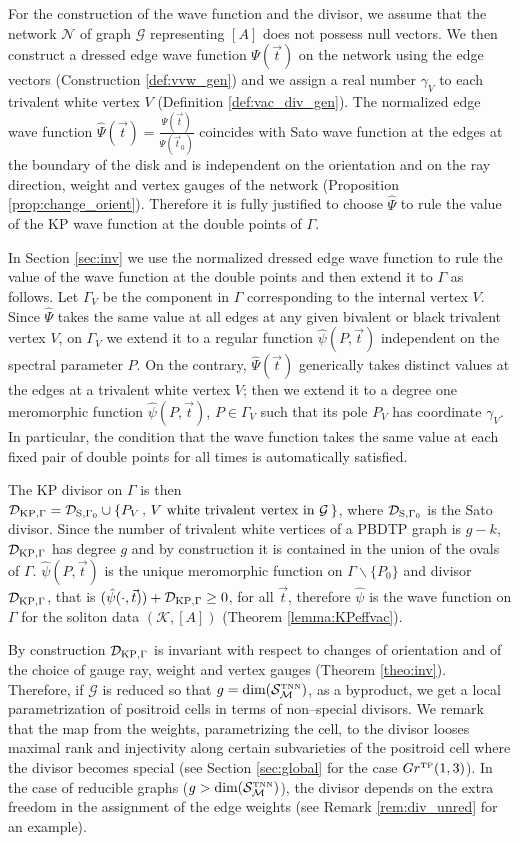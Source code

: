 \documentclass[11pt]{amsart}
\theoremstyle{plain}
\numberwithin{equation}{section}
\def \DKP {{\mathcal D}_{\textup{\scriptsize KP},\Gamma}}
\def \DS {{\mathcal D}_{\textup{\scriptsize S},\Gamma_0}}
\def \S {{\mathcal S}_{\mathcal M}^{\mbox{\tiny TNN}}}
\begin{document}
For the construction of the wave function and the divisor, we assume that the network $\mathcal N$ of graph $\mathcal G$ representing $[A]$ does not possess null vectors. 
We then construct a dressed edge wave function $\Psi (\vec t)$ on the network using the edge vectors (Construction \ref{def:vvw_gen}) and we assign a real number $\gamma_V$ to each trivalent white vertex $V$ (Definition \ref{def:vac_div_gen}). The normalized edge wave function $\hat \Psi(\vec t) = \frac{\Psi (\vec t)}{\Psi (\vec t_0)}$ coincides with Sato wave function at the edges at the boundary of the disk and is independent on the orientation and on the ray direction, weight and vertex gauges of the network (Proposition \ref{prop:change_orient}). Therefore it is fully justified to choose $\hat \Psi$ to rule the value of the KP wave function at the double points of $\Gamma$.

In Section \ref{sec:inv} we use the normalized dressed edge wave function to rule the value of the wave function at the double points and then extend it to $\Gamma$ as follows. Let $\Gamma_V$ be the component in $\Gamma$ corresponding to the internal vertex $V$.
Since $\hat \Psi$ takes the same value at all edges at any given bivalent or black trivalent vertex $V$, on $\Gamma_V$ we extend it to a regular function $\hat \psi(P,\vec t)$ independent on the spectral parameter $P$. On the contrary, $\hat \Psi (\vec t)$ generically takes distinct values at the edges at a trivalent white vertex $V$; then we extend it to a degree one meromorphic function  $\hat \psi(P,\vec t)$, $P\in\Gamma_V$ such that its pole $P_V$ has coordinate $\gamma_V$. In particular, the condition that the wave function takes the same value at each fixed pair of double points for all times is automatically satisfied.
 
The KP divisor on $\Gamma$ is then $\DKP =\DS \cup \{ P_V \, , \, V \mbox{ white trivalent vertex in } \mathcal G \, \}$, where $\DS$ is the Sato divisor. Since the number of trivalent white vertices of a PBDTP graph is $g-k$, $\DKP$ has degree $g$ and by construction it is contained in the union of the ovals of $\Gamma$. $\hat \psi(P,\vec t)$ is the unique meromorphic function on $\Gamma\backslash \{ P_0\}$ and divisor $\DKP$, that is $(\hat \psi(\cdot,\vec t)) + \DKP \ge 0$, for all $\vec t$, therefore $\hat \psi$ is the wave function on $\Gamma$ for the soliton data $(\mathcal K, [A])$ (Theorem \ref{lemma:KPeffvac}).

By construction $\DKP$ is invariant with respect to changes of orientation and of the choice of gauge ray, weight and vertex gauges (Theorem \ref{theo:inv}). Therefore, if $\mathcal G$ is reduced so that $g=\mbox{dim} (\S)$, as a byproduct, we get a local parametrization of positroid cells in terms of non--special divisors. We remark that the map from the weights, parametrizing the cell, to the divisor looses maximal rank and injectivity along certain subvarieties of the positroid cell where the divisor becomes special (see Section \ref{sec:global} for the case $Gr^{\mbox{\tiny TP}} (1,3)$). In the case of reducible graphs ($g>\mbox{dim} (\S)$), the divisor depends on the extra freedom in the assignment of the edge weights (see Remark \ref{rem:div_unred} for an example). 
\end{document}
